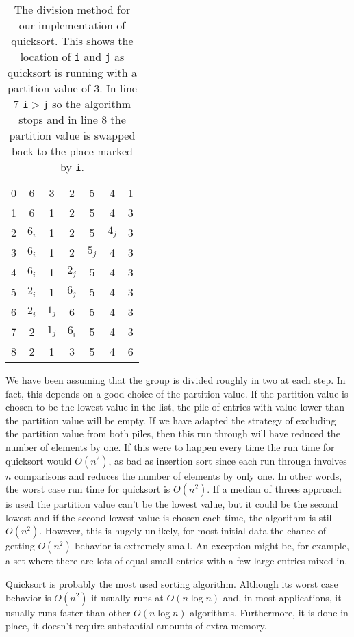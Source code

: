 \documentclass[11pt,a4paper]{scrartcl}
\begin{document}
\begin{table}
\begin{tabular}{c|cccccc}
0&6&3&2&5&4&1\\
1&6&1&2&5&4&3\\
2&$6_i$&1&2&5&$4_j$&3\\
3&$6_i$&1&2&$5_j$&4&3\\
4&$6_i$&1&$2_j$&5&4&3\\
5&$2_i$&1&$6_j$&5&4&3\\
6&$2_i$&$1_j$&6&5&4&3\\
7&2&$1_j$&$6_i$&5&4&3\\
8&2&1&3&5&4&6
\end{tabular}
\caption{The division method for our implementation of quicksort. This
  shows the location of \texttt{i} and \texttt{j} as quicksort is running with a partition value of 3. In line 7 \texttt{i}$>$\texttt{j}
  so the algorithm stops and in line 8 the partition value is swapped
  back to the place marked by \texttt{i}.\label{table_quick_careful}}
\end{table}

We have been assuming that the group is divided roughly in two at each
step. In fact, this depends on a good choice of the partition
value. If the partition value is chosen to be the lowest value in the
list, the pile of entries with value lower than the partition value
will be empty. If we have adapted the strategy of excluding the
partition value from both piles, then this run through will have
reduced the number of elements by one. If this were to happen every
time the run time for quicksort would $O(n^2)$, as bad as insertion
sort since each run through involves $n$ comparisons and reduces the
number of elements by only one. In other words, the worst case run
time for quicksort is $O(n^2)$. If a median of threes approach is used
the partition value can't be the lowest value, but it could be the
second lowest and if the second lowest value is chosen each time, the
algorithm is still $O(n^2)$. However, this is hugely unlikely, for
most initial data the chance of getting $O(n^2)$ behavior is extremely
small. An exception might be, for example, a set where there are lots
of equal small entries with a few large entries mixed in.

Quicksort is probably the most used sorting algorithm. Although its
worst case behavior is $O(n^2)$ it usually runs at $O(n\log{n})$ and,
in most applications, it usually runs faster than other $O(n\log{n})$
algorithms. Furthermore, it is done in place, it doesn't require
substantial amounts of extra memory.
\end{document}

